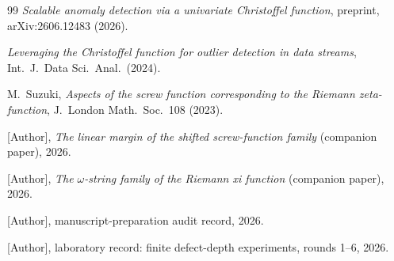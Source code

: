 \documentclass[11pt]{amsart}
\theoremstyle{definition}
\theoremstyle{remark}
\begin{document}
\begin{thebibliography}{99}
\emph{Scalable anomaly detection via a univariate Christoffel function},
preprint, arXiv:2606.12483 (2026). %

\emph{Leveraging the Christoffel function for outlier detection in data
streams}, Int.\ J.\ Data Sci.\ Anal.\ (2024). %

 M.~Suzuki,
\emph{Aspects of the screw function corresponding to the Riemann
zeta-function}, J.\ London Math.\ Soc.\ 108 (2023). %

 [Author],
\emph{The linear margin of the shifted screw-function family} (companion
paper), 2026. %

 [Author],
\emph{The $\omega$-string family of the Riemann xi function} (companion
paper), 2026. %

 [Author],
manuscript-preparation audit record, 2026. %

 [Author],
laboratory record: finite defect-depth experiments, rounds 1--6, 2026.

\end{thebibliography}
\end{document}
